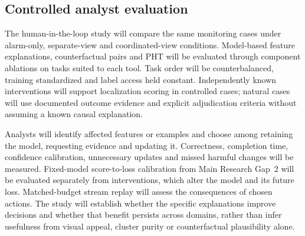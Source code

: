 \documentclass[10pt,a4paper]{article}
\begin{document}
\subsection{Controlled analyst evaluation}
The human-in-the-loop study will compare the same monitoring cases under alarm-only, separate-view and coordinated-view conditions. Model-based feature explanations, counterfactual pairs and PHT will be evaluated through component ablations on tasks suited to each tool. Task order will be counterbalanced, training standardized and label access held constant. Independently known interventions will support localization scoring in controlled cases; natural cases will use documented outcome evidence and explicit adjudication criteria without assuming a known causal explanation.

Analysts will identify affected features or examples and choose among retaining the model, requesting evidence and updating it. Correctness, completion time, confidence calibration, unnecessary updates and missed harmful changes will be measured. Fixed-model score-to-loss calibration from Main Research Gap~2 will be evaluated separately from interventions, which alter the model and its future loss. Matched-budget stream replay will assess the consequences of chosen actions. The study will establish whether the specific explanations improve decisions and whether that benefit persists across domains, rather than infer usefulness from visual appeal, cluster purity or counterfactual plausibility alone.
\end{document}

